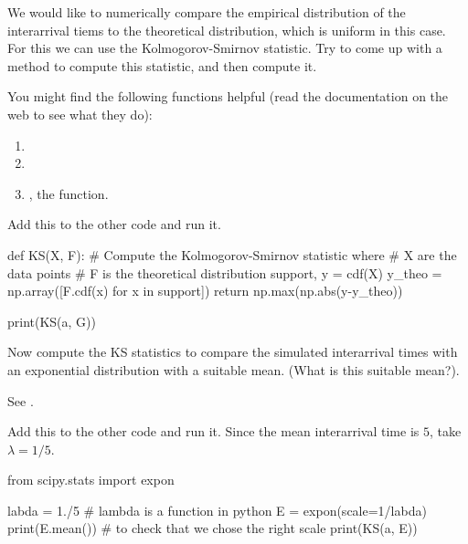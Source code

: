 \documentclass{scrartcl}
\begin{document}
\begin{exercise}
We would like to numerically compare the empirical distribution of the interarrival tiems to the theoretical distribution, which is uniform in this case. 
For this we can use the Kolmogorov-Smirnov statistic. Try to come up with a method to compute this statistic, and then compute it. 

You might find the following functions helpful (read the documentation on the web to see what they do):
\begin{enumerate}
\item {}
\item {}
\item {}, the  function.
\end{enumerate}

\begin{solution}
Add this to the other code and run it.
\begin{pyverbatim}
def KS(X, F):
    # Compute the Kolmogorov-Smirnov statistic where
    # X are the data points
    # F is the theoretical distribution
    support, y = cdf(X)
    y_theo = np.array([F.cdf(x) for x in support])
    return np.max(np.abs(y-y_theo))

print(KS(a, G))    
\end{pyverbatim}
\end{solution}
\end{exercise}

\begin{exercise}
  Now compute the KS statistics to compare the simulated interarrival times with an exponential distribution with a suitable mean. (What is this suitable mean?).

See .


\begin{solution}
Add this to the other code and run it. Since the mean interarrival time is $5$, take $\lambda = 1/5$.

\begin{pyverbatim}
from scipy.stats import expon

labda = 1./5 # lambda is a function in python
E = expon(scale=1/labda) 
print(E.mean()) # to check that we chose the right scale
print(KS(a, E))    
\end{pyverbatim}
\end{solution}
\end{exercise}
\end{document}
